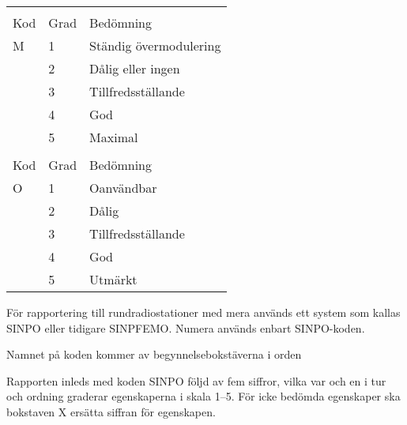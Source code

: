\begin{table}[ht]
\begin{center}
\begin{tabular}{lll}
  & & \\
  Kod & Grad & Bedömning \\
  M   & 1    & Ständig övermodulering \\
      & 2    & Dålig eller ingen \\
      & 3    & Tillfredsställande \\
      & 4    & God \\
      & 5    & Maximal \\

  & & \\
  Kod & Grad & Bedömning \\
  O   & 1    & Oanvändbar \\
      & 2    & Dålig \\
      & 3    & Tillfredsställande \\
      & 4    & God \\
      & 5    & Utmärkt \\
\end{tabular}
\end{center}
\end{table}

För rapportering till rundradiostationer med mera används ett system som kallas
SINPO eller tidigare SINPFEMO.
Numera används enbart SINPO-koden.

Namnet på koden kommer av begynnelsebokstäverna i orden


Rapporten inleds med koden SINPO följd av fem siffror, vilka var och en i tur
och ordning graderar egenskaperna i skala 1--5.
För icke bedömda egenskaper ska bokstaven X ersätta siffran för egenskapen.
